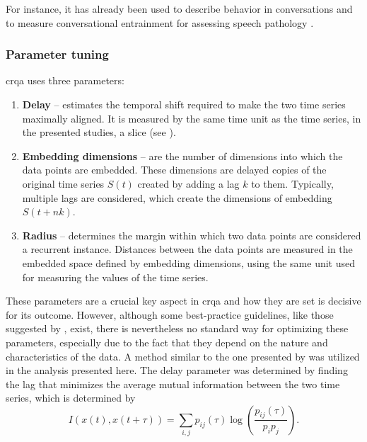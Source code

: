 For instance, it has already been used to describe behavior in conversations \citep{Duran2017conversing} and to measure conversational entrainment for assessing speech pathology \citep{Borrie2019syncing}.

\subsubsection{Parameter tuning}
\label{subsubsec:parameters_crqa}

\Ac{crqa} uses three parameters:

\begin{enumerate}
	\item \textbf{Delay} -- estimates the temporal shift required to make the two time series maximally aligned.
	It is measured by the same time unit as the time series, in the presented studies, a slice (see ).
	
	\item \textbf{Embedding dimensions} -- are the number of dimensions into which the data points are embedded.
	These dimensions are delayed copies of the original time series $S(t)$ created by adding a lag $k$ to them.
	Typically, multiple lags are considered, which create the dimensions of embedding $S(t + nk)$.
	
	\item \textbf{Radius} -- determines the margin within which two data points are considered a recurrent instance.
	Distances between the data points are measured in the embedded space defined by embedding dimensions, using the same unit used for measuring the values of the time series.
\end{enumerate}
%
These parameters are a crucial key aspect in \ac{crqa} and how they are set is decisive for its outcome.
However, although some best-practice guidelines, like those suggested by \citet{Coco2014crqa-r}, exist, there is nevertheless no standard way for optimizing these parameters, especially due to the fact that they depend on the nature and characteristics of the data.
A method similar to the one presented by \citet{Marwan2007recurrence} was utilized in the analysis presented here.
The delay parameter was determined by finding the lag that minimizes the average mutual information between the two time series, which is determined by
%
\begin{equation}
	\label{eq:average_mutual_information}
	I\left( x(t), x(t + \tau) \right) = \sum_{i,j} p_{ij} (\tau) \log \left( \frac{p_{ij} \left( \tau \right)}{p_i p_j} \right).
\end{equation}
